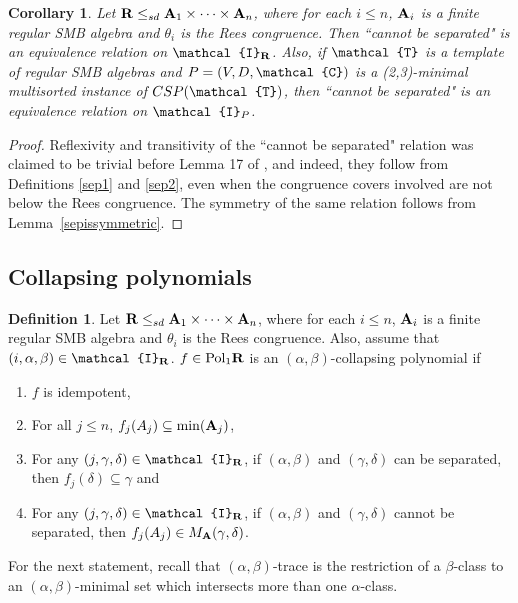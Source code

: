 \documentclass[11pt]{amsart}
\newcommand{\m}[1]{{\uppercase {\mathbf {#1}}}}
\newcommand{\vr}[1]{{\uppercase {\mathcal{#1}}}}
\newcommand{\poln}[2]{{\rm Pol_{#1}\m #2}}
\newtheorem{cor}[thm]{Corollary}
\theoremstyle{definition}
\newtheorem{df}[thm]{Definition}
\begin{document}
\begin{cor}\label{cantsepisequiv}
Let $\m R\leq_{sd}\m a_1\times\dots\times\m a_n$, where for each $i\leq n$, $\m a_i$ is a finite regular SMB algebra and $\theta_i$ is the Rees congruence. Then ``cannot be separated" is an equivalence relation on $\vr i_{\m R}$. Also, if $\vr t$ is a template of regular SMB algebras and $P=(V,D,\vr c)$ is a (2,3)-minimal multisorted instance of $CSP(\vr t)$, then ``cannot be separated" is an equivalence relation on $\vr i_P$.
\end{cor}

\begin{proof}
Reflexivity and transitivity of the ``cannot be separated" relation was claimed to be trivial before Lemma 17 of \cite{BuSMB}, and indeed, they follow from Definitions \ref{sep1} and \ref{sep2}, even when the congruence covers involved are not below the Rees congruence. The symmetry of the same relation follows from Lemma~\ref{sepissymmetric}.
\end{proof}

\subsection{Collapsing polynomials}

\begin{df}\label{collapsingpolydef}
Let $\m R\leq_{sd}\m a_1\times\dots\times\m a_n$, where for each $i\leq n$, $\m a_i$ is a finite regular SMB algebra and $\theta_i$ is the Rees congruence. Also, assume that $(i,\alpha,\beta)\in \vr i_{\m R}$. $f\in \poln{1}{R}$ is an $(\alpha,\beta)$-collapsing polynomial if
\begin{enumerate}
\item $f$ is idempotent,
\item For all $j\leq n$, $f_j(A_j)\subseteq\mathrm{min}(\m a_j)$,
\item For any $(j,\gamma,\delta)\in\vr i_{\m R}$, if $(\alpha,\beta)$ and $(\gamma,\delta)$ can be separated, then $f_j(\delta)\subseteq \gamma$ and 
\item For any $(j,\gamma,\delta)\in\vr i_{\m R}$, if $(\alpha,\beta)$ and $(\gamma,\delta)$ cannot be separated, then $f_j(A_j)\in M_{\m a}(\gamma,\delta)$.
\end{enumerate}
\end{df}

For the next statement, recall that $(\alpha,\beta)$-trace is the restriction of a $\beta$-class to an $(\alpha,\beta)$-minimal set which intersects more than one $\alpha$-class. 
\end{document}
